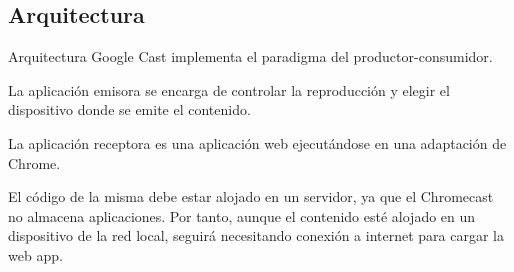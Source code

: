 \subsection{Arquitectura}
\begin{frame}{Arquitectura}
	Google Cast implementa el paradigma del productor-consumidor.
	\begin{block}{ }
		La aplicación emisora se encarga de controlar la reproducción y elegir el dispositivo donde se emite el contenido. 
	\end{block}
	
	\begin{block}{ }
		La aplicación receptora es una aplicación web ejecutándose en una adaptación de Chrome.
		
		El código de la misma debe estar alojado en un servidor, ya que el Chromecast no almacena aplicaciones. Por tanto, aunque el contenido esté alojado en un dispositivo de la red local, seguirá necesitando conexión a internet para cargar la web app. 
	\end{block}
\end{frame}



